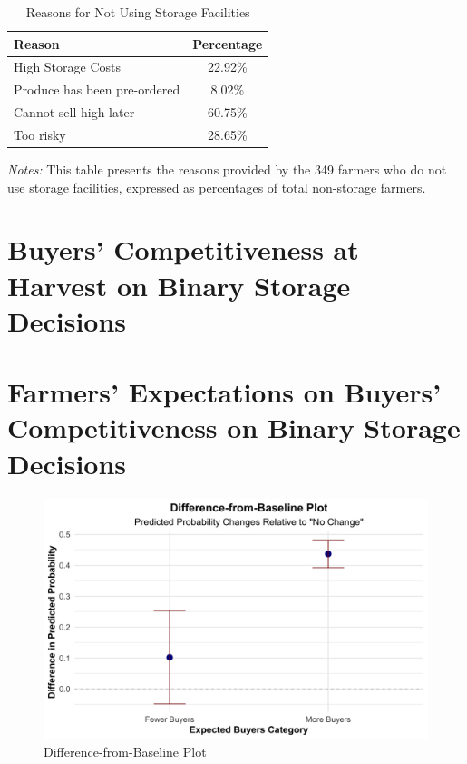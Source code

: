 \documentclass[12pt]{article}
\begin{document}
\begin{table}[H]
    \centering
    \footnotesize
    \begin{threeparttable}
        \caption{Reasons for Not Using Storage Facilities}
        \label{tab:non_storage_reasons}
        \begin{tabular}{lc}
            \toprule
            \textbf{Reason} & \textbf{Percentage} \\
            \midrule
            High Storage Costs & 22.92\% \\
            Produce has been pre-ordered & 8.02\% \\
            Cannot sell high later & 60.75\% \\
            Too risky & 28.65\% \\
            \bottomrule
        \end{tabular}
        \begin{tablenotes}
            \item \textit{Notes:} This table presents the reasons provided by the 349 farmers who do not use storage facilities, expressed as percentages of total non-storage farmers.
        \end{tablenotes}
    \end{threeparttable}
\end{table}




\newpage
\section{Buyers' Competitiveness at Harvest on Binary Storage Decisions}




\newpage
\section{Farmers' Expectations on Buyers' Competitiveness on Binary Storage Decisions}





\begin{figure}[H]
\centering
\includegraphics[width=1\textwidth]{Figures/filtered_difference_from_baseline_plot.png}
\caption{Difference-from-Baseline Plot}
\label{Figure: Difference-from-Baseline Plot}
\end{figure}
\end{document}
